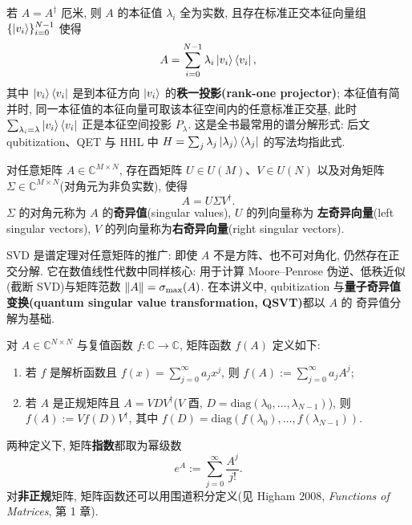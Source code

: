 \documentclass[utf8]{article} %
\numberwithin{equation}{section}   %
\newtheorem{Def}{\hskip 2em {\color{green} 定义}}[subsection]
\newtheorem{Thm}{\hskip 2em {\color{blue} 定理}}[subsection]
\newtheorem{Note}{\hskip 2em {\color{red} 注}}[subsection]
\newtheorem{Cor}{\hskip 2em {\color{cyan} 推论}}[subsection]
\begin{document}
\begin{Cor}[厄米矩阵的谱分解]
    若 $A = A^\dagger$ 厄米, 则 $A$ 的本征值 $\lambda_i$ 全为实数, 且存在标准正交本征向量组
    $\{\ket{v_i}\}_{i=0}^{N-1}$ 使得
    \begin{equation}
        A = \sum_{i=0}^{N-1} \lambda_i \ket{v_i}\bra{v_i},
    \end{equation}
    其中 $\ket{v_i}\bra{v_i}$ 是到本征方向 $\ket{v_i}$ 的\textbf{秩一投影(rank-one projector)};
    本征值有简并时, 同一本征值的本征向量可取该本征空间内的任意标准正交基,
    此时 $\sum_{\lambda_i = \lambda} \ket{v_i}\bra{v_i}$ 正是本征空间投影 $P_\lambda$.
    这是全书最常用的谱分解形式: 后文 qubitization、QET 与 HHL 中
    $H = \sum_j \lambda_j \ket{\lambda_j}\bra{\lambda_j}$ 的写法均指此式.
\end{Cor}

\begin{Thm}[奇异值分解]
    对任意矩阵 $A \in \mathbb{C}^{M\times N}$, 存在酉矩阵 $U \in U(M)$、$V \in U(N)$
    以及对角矩阵 $\Sigma \in \mathbb{C}^{M\times N}$(对角元为非负实数), 使得
    \begin{equation}
        A = U \Sigma V^\dagger.
    \end{equation}
    $\Sigma$ 的对角元称为 $A$ 的\textbf{奇异值}(singular values), $U$ 的列向量称为
    \textbf{左奇异向量}(left singular vectors), $V$ 的列向量称为\textbf{右奇异向量}(right singular vectors).
\end{Thm}

\begin{Note}
    SVD 是谱定理对任意矩阵的推广: 即使 $A$ 不是方阵、也不可对角化, 仍然存在正交分解.
    它在数值线性代数中同样核心: 用于计算 Moore--Penrose 伪逆、低秩近似(截断 SVD)与矩阵范数
    $\norm{A} = \sigma_{\max}(A)$. 在本讲义中, qubitization 与\textbf{量子奇异值变换(quantum singular value transformation, QSVT)}都以 $A$ 的
    奇异值分解为基础.
\end{Note}

\begin{Def}[矩阵函数与矩阵指数]
    对 $A \in \mathbb{C}^{N\times N}$ 与复值函数 $f: \mathbb{C} \to \mathbb{C}$, 矩阵函数 $f(A)$ 定义如下:
    \begin{enumerate}
        \item 若 $f$ 是解析函数且 $f(x) = \sum_{j=0}^\infty a_j x^j$, 则
        $f(A) := \sum_{j=0}^\infty a_j A^j$;
        \item 若 $A$ 是正规矩阵且 $A = V D V^\dagger$($V$ 酉, $D = \mathrm{diag}(\lambda_0, \dots, \lambda_{N-1})$),
        则 $f(A) := V f(D) V^\dagger$, 其中 $f(D) = \mathrm{diag}(f(\lambda_0), \dots, f(\lambda_{N-1}))$.
    \end{enumerate}
    两种定义下, 矩阵\textbf{指数}都取为幂级数
    \begin{equation}
        e^A := \sum_{j=0}^\infty \frac{A^j}{j!}.
    \end{equation}
    对\textbf{非正规}矩阵, 矩阵函数还可以用围道积分定义(见 Higham 2008, \textit{Functions of Matrices}, 第 1 章).
\end{Def}
\end{document}
